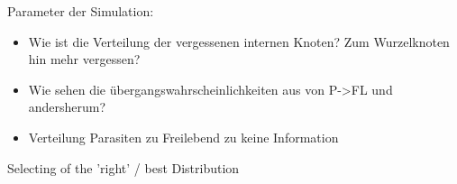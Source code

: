   Parameter der Simulation:
  \begin{itemize}
    \item Wie ist die Verteilung der vergessenen internen Knoten? Zum Wurzelknoten hin mehr vergessen?
    \item Wie sehen die übergangswahrscheinlichkeiten aus von P->FL und andersherum?
    \item Verteilung Parasiten zu Freilebend zu keine Information
  \end{itemize}


  Selecting of the 'right'  / best Distribution
  






